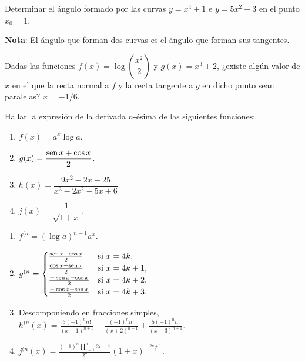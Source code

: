 {Determinar el ángulo formado por las curvas $y=x^4+1$ e $y=5x^2-3$ en el punto $x_{0}=1$.

\noindent \textbf{Nota}: El ángulo que forman dos curvas es el ángulo
que forman sus tangentes.
}


{Dadas las funciones $f(x)=\log \left(\dfrac{x^2}{2}\right)$ y $g(x)=x^3+2$, ¿existe algún valor de $x$ en el que la recta normal a $f$ y
la recta tangente a $g$ en dicho punto sean paralelas? }
{$x=-1/6$.
}
{
}


{Hallar la expresión de la derivada $n$-ésima de las siguientes funciones:
\begin{multicols}{2}
\begin{enumerate}
\item  $f(x)=a^x\log a$.
\item  $g(x)=\dfrac{\operatorname{sen} x+\cos x}{2}$.
\item  $h(x)=\dfrac{9x^2-2x-25}{x^3-2x^2-5x+6}$.
\item  $j(x)=\dfrac{1}{\sqrt{1+x}}$.
\end{enumerate}
\end{multicols}
}
{\begin{enumerate}
\item $f^{(n} = (\log a)^{n+1} a^x$.
\item $g^{(n}=
\begin{cases}
\frac{\operatorname{sen} x + \cos x}{2} & \mbox{si $x=4k$,}\\
\frac{\cos x - \operatorname{sen} x}{2} & \mbox{si $x=4k+1$,}\\
\frac{-\operatorname{sen} x - \cos x}{2} & \mbox{si $x=4k+2$,}\\
\frac{-\cos x + \operatorname{sen} x}{2} & \mbox{si $x=4k+3$.}\\
\end{cases}$
\item Descomponiendo en fracciones simples, $h^{(n}(x) = \frac{3(-1)^n n!}{(x-1)^{n+1}} + \frac{(-1)^n n!}{(x+2)^{n+1}} + \frac{5(-1)^n n!}{(x-3)^{n+1}}$.
\item $j^{(n}(x) = \frac{(-1)^n \prod_{i=1}^{n}2i-1}{2^n}(1+x)^{-\frac{2n+1}{2}}$.
\end{enumerate}
}
{
}


